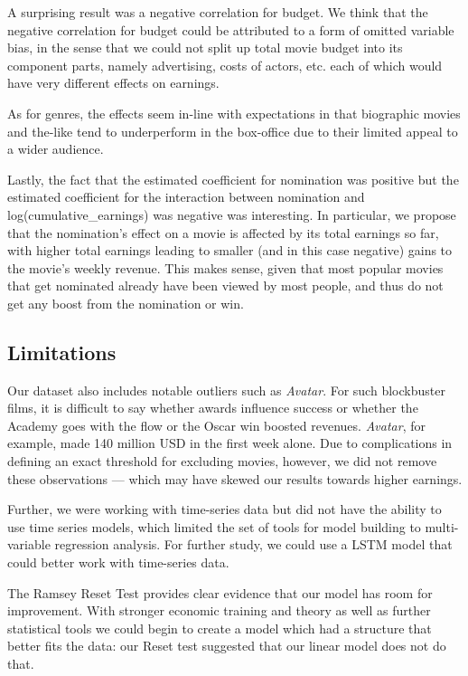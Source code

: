 \documentclass[11pt]{article} %
\begin{document}
A surprising result was a negative correlation for budget. We think that the negative correlation for budget could be attributed to a form of omitted variable bias, in the sense that we could not split up total movie budget into its component parts, namely advertising, costs of actors, etc. each of which would have very different effects on earnings.

As for genres, the effects seem in-line with expectations in that biographic movies and the-like tend to underperform in the box-office due to their limited appeal to a wider audience.

Lastly, the fact that the estimated coefficient for nomination was positive but the estimated coefficient for the interaction between nomination and log(cumulative\_earnings) was negative was interesting. In particular, we propose that the nomination's effect on a movie is affected by its total earnings so far, with higher total earnings leading to smaller (and in this case negative) gains to the movie's weekly revenue. This makes sense, given that most popular movies that get nominated already have been viewed by most people, and thus do not get any boost from the nomination or win.



\subsection{Limitations}
Our dataset also includes notable outliers such as \textit{Avatar}. For such blockbuster films, it is difficult to say whether awards influence success or whether the Academy goes with the flow or the Oscar win boosted revenues. \textit{Avatar}, for example, made 140 million USD in the first week alone. Due to complications in defining an exact threshold for excluding movies, however, we did not remove these observations — which may have skewed our results towards higher earnings. 


Further, we were working with time-series data but did not have the ability to use time series models, which limited the set of tools for model building to multi-variable regression analysis. For further study, we could use a LSTM model that could better work with time-series data. 

The Ramsey Reset Test provides clear evidence that our model has room for improvement. With stronger economic training and theory as well as further statistical tools we could begin to create a model which had a structure that better fits the data: our Reset test suggested that our linear model does not do that.
\end{document}
